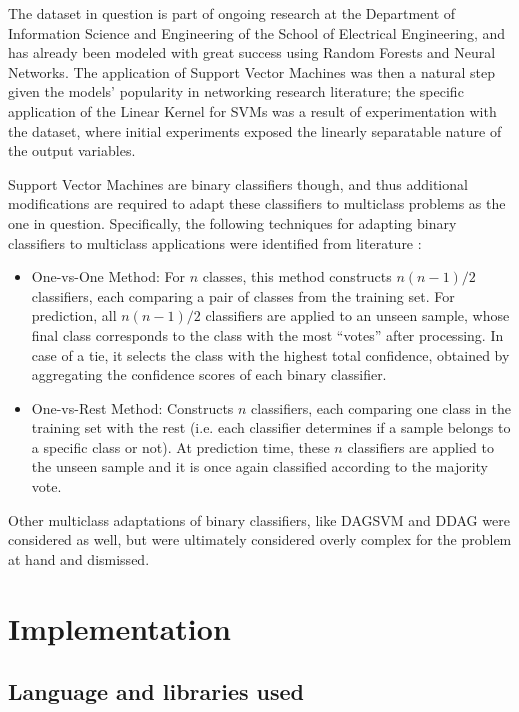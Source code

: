 \documentclass{kthreport}
\theoremstyle{definition}
\begin{document}
The dataset in question is part of ongoing research at the Department of Information Science and Engineering of the School of Electrical Engineering, and has already been modeled with great success using Random Forests and Neural Networks. The application of Support Vector Machines was then a natural step given the models' popularity in networking research literature; the specific application of the Linear Kernel for SVMs was a result of experimentation with the dataset, where initial experiments exposed the linearly separatable nature of the output variables.

Support Vector Machines are binary classifiers though, and thus additional modifications are required to adapt these classifiers to multiclass problems as the one in question. Specifically, the following techniques for adapting binary classifiers to multiclass applications were identified from literature \autocite{hsu2002comparison,tax2002multiclass}:

\begin{itemize}
	\item One-vs-One Method: For $n$ classes, this method constructs $n(n-1)/2$ classifiers, each comparing a pair of classes from the training set. For prediction, all $n(n-1)/2$ classifiers are applied to an unseen sample, whose final class corresponds to the class with the most ``votes'' after processing. In case of a tie, it selects the class with the highest total confidence, obtained by aggregating the confidence scores of each binary classifier.
	\item One-vs-Rest Method: Constructs $n$ classifiers, each comparing one class in the training set with the rest (i.e. each classifier determines if a sample belongs to a specific class or not). At prediction time, these $n$ classifiers are applied to the unseen sample and it is once again classified according to the majority vote.
\end{itemize}

Other multiclass adaptations of binary classifiers, like DAGSVM \autocite{chen2009dagsvm} and DDAG \autocite{platt2000ddag} were considered as well, but were ultimately considered overly complex for the problem at hand and dismissed.



\section{Implementation}

\subsection{Language and libraries used}
\end{document}
